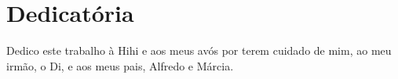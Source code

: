 \chapter*{Dedicatória}

\noindent Dedico este trabalho à Hihi e aos meus avós por terem cuidado de mim, ao meu irmão, o Di, e aos meus pais, Alfredo e Márcia.
